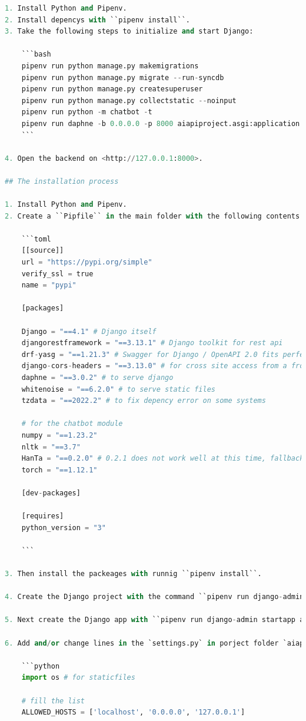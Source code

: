 \documentclass[12pt,oneside,titlepage,listof=totoc,bibliography=totoc]{scrartcl}
\begin{document}
\begin{appendices}
\begin{lstlisting}[language=python,numbers=none]
1. Install Python and Pipenv.
2. Install depencys with ``pipenv install``.
3. Take the following steps to initialize and start Django:

    ```bash
    pipenv run python manage.py makemigrations
    pipenv run python manage.py migrate --run-syncdb    
    pipenv run python manage.py createsuperuser
    pipenv run python manage.py collectstatic --noinput 
    pipenv run python -m chatbot -t
    pipenv run daphne -b 0.0.0.0 -p 8000 aiapiproject.asgi:application
    ```

4. Open the backend on <http://127.0.0.1:8000>.

## The installation process

1. Install Python and Pipenv.
2. Create a ``Pipfile`` in the main folder with the following contents:

    ```toml
    [[source]]
    url = "https://pypi.org/simple"
    verify_ssl = true
    name = "pypi"

    [packages]

    Django = "==4.1" # Django itself 
    djangorestframework = "==3.13.1" # Django toolkit for rest api
    drf-yasg = "==1.21.3" # Swagger for Django / OpenAPI 2.0 fits perfectly
    django-cors-headers = "==3.13.0" # for cross site access from a frontend
    daphne = "==3.0.2" # to serve django 
    whitenoise = "==6.2.0" # to serve static files
    tzdata = "==2022.2" # to fix depency error on some systems

    # for the chatbot module
    numpy = "==1.23.2" 
    nltk = "==3.7"
    HanTa = "==0.2.0" # 0.2.1 does not work well at this time, fallback to 0.2.0
    torch = "==1.12.1"

    [dev-packages]

    [requires]
    python_version = "3"

    ```

3. Then install the packeages with runnig ``pipenv install``.

4. Create the Django project with the command ``pipenv run django-admin startproject aiapiproject .`` in the same folder.

5. Next create the Django app with ``pipenv run django-admin startapp aiapiapp``.

6. Add and/or change lines in the `settings.py` in porject folder `aiapiproject`:

    ```python
    import os # for staticfiles

    # fill the list
    ALLOWED_HOSTS = ['localhost', '0.0.0.0', '127.0.0.1']


\end{lstlisting}
\end{appendices}
\end{document}
